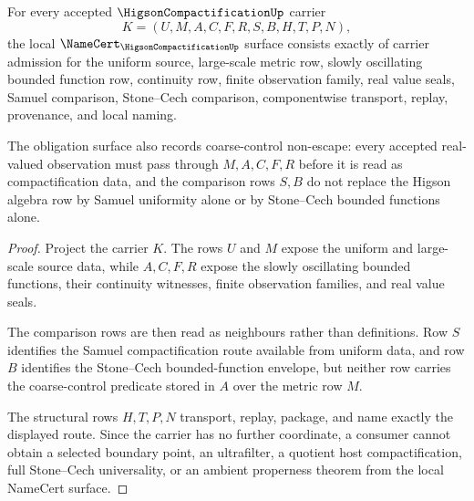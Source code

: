 \begin{theorem}
\label{thm:higson-compactification-namecert-obligations}
For every accepted $\HigsonCompactificationUp$ carrier
$$
K=(U,M,A,C,F,R,S,B,H,T,P,N),
$$
the local $\NameCert_{\HigsonCompactificationUp}$ surface consists exactly of carrier admission for the uniform source, large-scale metric row, slowly oscillating bounded function row, continuity row, finite observation family, real value seals, Samuel comparison, Stone--Cech comparison, componentwise transport, replay, provenance, and local naming.

The obligation surface also records coarse-control non-escape: every accepted real-valued observation must pass through $M,A,C,F,R$ before it is read as compactification data, and the comparison rows $S,B$ do not replace the Higson algebra row by Samuel uniformity alone or by Stone--Cech bounded functions alone.
\end{theorem}
\begin{proof}
Project the carrier $K$. The rows $U$ and $M$ expose the uniform and large-scale source data, while $A,C,F,R$ expose the slowly oscillating bounded functions, their continuity witnesses, finite observation families, and real value seals.

The comparison rows are then read as neighbours rather than definitions. Row $S$ identifies the Samuel compactification route available from uniform data, and row $B$ identifies the Stone--Cech bounded-function envelope, but neither row carries the coarse-control predicate stored in $A$ over the metric row $M$.

The structural rows $H,T,P,N$ transport, replay, package, and name exactly the displayed route. Since the carrier has no further coordinate, a consumer cannot obtain a selected boundary point, an ultrafilter, a quotient host compactification, full Stone--Cech universality, or an ambient properness theorem from the local NameCert surface.
\end{proof}

